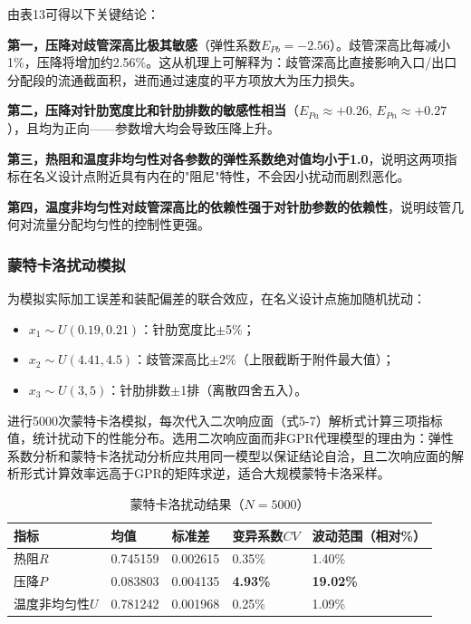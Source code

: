 \documentclass[12pt,a4paper]{ctexart}
\begin{document}
由表13可得以下关键结论：

\textbf{第一，压降对歧管深高比极其敏感}（弹性系数$E_{Pb} = -2.56$）。歧管深高比每减小1\%，压降将增加约2.56\%。这从机理上可解释为：歧管深高比直接影响入口/出口分配段的流通截面积，进而通过速度的平方项放大为压力损失。

\textbf{第二，压降对针肋宽度比和针肋排数的敏感性相当}（$E_{Pa} \approx +0.26$, $E_{Pn} \approx +0.27$），且均为正向——参数增大均会导致压降上升。

\textbf{第三，热阻和温度非均匀性对各参数的弹性系数绝对值均小于1.0}，说明这两项指标在名义设计点附近具有内在的"阻尼"特性，不会因小扰动而剧烈恶化。

\textbf{第四，温度非均匀性对歧管深高比的依赖性强于对针肋参数的依赖性}，说明歧管几何对流量分配均匀性的控制性更强。

\subsubsection{蒙特卡洛扰动模拟}

为模拟实际加工误差和装配偏差的联合效应，在名义设计点施加随机扰动：

\begin{itemize}
\item $x_1 \sim U(0.19, 0.21)$：针肋宽度比$\pm$5\%；
\item $x_2 \sim U(4.41, 4.5)$：歧管深高比$\pm$2\%（上限截断于附件最大值）；
\item $x_3 \sim U(3, 5)$：针肋排数$\pm$1排（离散四舍五入）。
\end{itemize}

进行5000次蒙特卡洛模拟，每次代入二次响应面（式5-7）解析式计算三项指标值，统计扰动下的性能分布。选用二次响应面而非GPR代理模型的理由为：弹性系数分析和蒙特卡洛扰动分析应共用同一模型以保证结论自洽，且二次响应面的解析形式计算效率远高于GPR的矩阵求逆，适合大规模蒙特卡洛采样。

\begin{table}[H]
\centering
\caption{蒙特卡洛扰动结果（$N=5000$）}
\footnotesize
\begin{tabular}{p{}p{}p{}p{}p{}}
\toprule
指标 & 均值 & 标准差 & 变异系数$CV$ & 波动范围（相对\%） \\
\midrule
热阻$R$ & 0.745159 & 0.002615 & 0.35\% & 1.40\% \\
压降$P$ & 0.083803 & 0.004135 & \textbf{4.93\%} & \textbf{19.02\%} \\
温度非均匀性$U$ & 0.781242 & 0.001968 & 0.25\% & 1.09\% \\
\bottomrule
\end{tabular}
\end{table}
\end{document}
